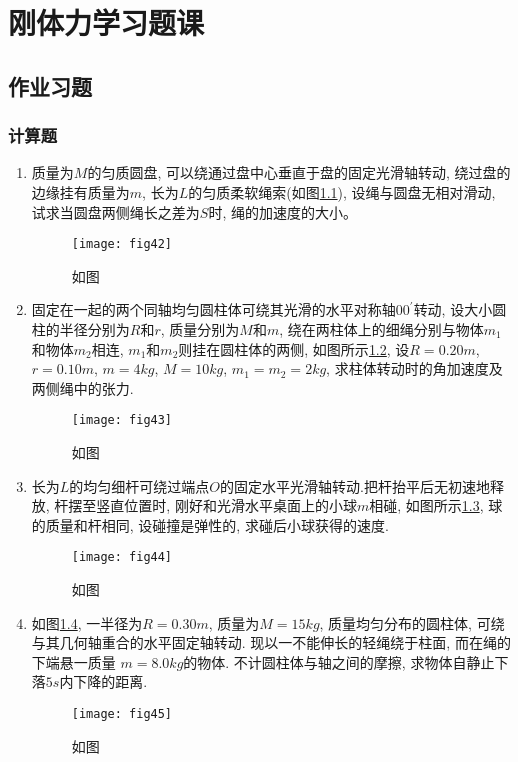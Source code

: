 \chapter{刚体力学习题课}
\section{作业习题}
\subsection*{计算题}
\begin{enumerate}
    \item 质量为$M$的匀质圆盘, 可以绕通过盘中心垂直于盘的固定光滑轴转动, 
    绕过盘的边缘挂有质量为$m$, 长为$L$的匀质柔软绳索(如图\ref{fig:42}), 
    设绳与圆盘无相对滑动, 试求当圆盘两侧绳长之差为$S$时, 
    绳的加速度的大小。
    \begin{figure}[h]
        \centering
        \texttt{[image: fig42]}
        \caption{如图}\label{fig:42}
    \end{figure}
    \item 固定在一起的两个同轴均匀圆柱体可绕其光滑的水平对称轴$00^{'}$转动, 设大小圆柱的半径分别为$R$和$r$, 
    质量分别为$M$和$m$, 绕在两柱体上的细绳分别与物体$m_1$和物体$m_2$相连, $m_1$和$m_2$则挂在圆柱体的两侧, 如图所示\ref{fig:43}, 
    设$R=0.20m$, $r=0.10m$, $m=4kg$, $M=10kg$, $m_1=m_2=2kg$, 求柱体转动时的角加速度及两侧绳中的张力.
    \begin{figure}[h]
        \centering
        \texttt{[image: fig43]}
        \caption{如图}\label{fig:43}
    \end{figure}
    \item 长为$L$的均匀细杆可绕过端点$O$的固定水平光滑轴转动.把杆抬平后无初速地释放, 杆摆至竖直位置时, 刚好和光滑水平桌面上的小球$m$相碰, 如图所示\ref{fig:44}, 
    球的质量和杆相同, 设碰撞是弹性的, 求碰后小球获得的速度.
    \begin{figure}[H]
        \centering
        \texttt{[image: fig44]}
        \caption{如图}\label{fig:44}
    \end{figure}
    \item 如图\ref{fig:45}, 一半径为$R=0.30m$, 质量为$M=15kg$, 质量均匀分布的圆柱体, 可绕与其几何轴重合的水平固定轴转动. 现以一不能伸长的轻绳绕于柱面, 而在绳的下端悬一质量
    $m=8.0 kg$的物体. 不计圆柱体与轴之间的摩擦, 求物体自静止下落$5s$内下降的距离.
    \begin{figure}[H]
        \centering
        \texttt{[image: fig45]}
        \caption{如图}\label{fig:45}
    \end{figure}
\end{enumerate}

